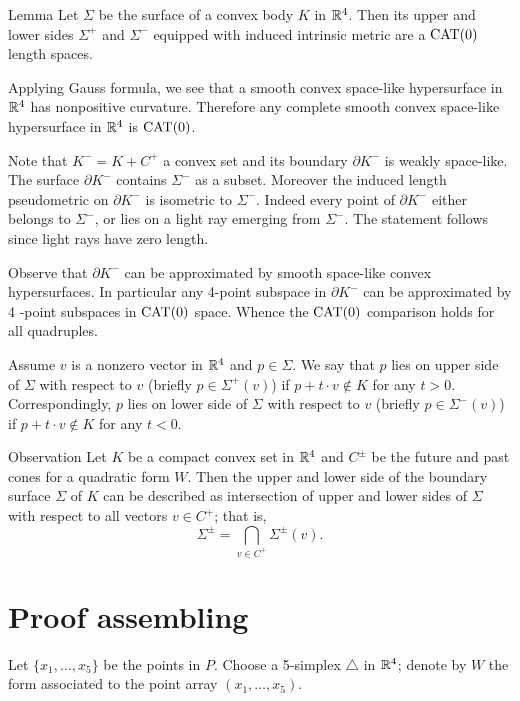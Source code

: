 \documentclass{article}
\begin{document}
\begin{thm}{Lemma}\label{lem:sides}
Let $\Sigma$ be the surface of a convex body $K$ in $\mathbb{R}^4$.
Then its upper and lower sides $\Sigma^+$ and $\Sigma^-$ equipped with induced intrinsic metric are a $\mathrm{CAT}(0)$ length spaces. 
\end{thm}

Applying Gauss formula, we see that a smooth convex space-like hypersurface in $\mathbb{R}^4$ has nonpositive curvature.
Therefore any complete smooth convex space-like hypersurface in $\mathbb{R}^4$ is $\mathrm{CAT}(0)$.

Note that $K^-=K+C^+$ a convex set and its boundary $\partial K^-$ is weakly space-like.
The surface $\partial K^-$ contains $\Sigma^-$ as a subset.
Moreover the induced length pseudometric on $\partial K^-$ is isometric to $\Sigma^-$.
Indeed every point of $\partial K^-$ either belongs to  $\Sigma^-$, or lies on a light ray emerging from $\Sigma^-$.
The statement follows since light rays have zero length.

Observe that $\partial K^-$ can be approximated by smooth space-like convex hypersurfaces.
In particular any 4-point subspace in $\partial K^-$ can be approximated by 4 -point subspaces in $\mathrm{CAT}(0)$ space.
Whence the $\mathrm{CAT}(0)$ comparison holds for all quadruples.
\qeds




Assume $v$ is a nonzero vector in $\mathbb{R}^4$ and $p\in\Sigma$.
We say that $p$ lies on upper side of $\Sigma$ with respect to $v$ (briefly $p\in \Sigma^+(v)$) if $p+t\cdot v\notin K$ for any $t>0$.
Correspondingly, $p$ lies on lower side of $\Sigma$ with respect to $v$ (briefly $p\in \Sigma^-(v)$) if $p+t\cdot v\notin K$ for any $t<0$.

\begin{thm}{Observation}\label{obs:Sigma(v)}
Let $K$ be a compact convex set in $\mathbb{R}^4$ and $C^\pm$ be the future and past cones for a quadratic form $W$.
Then the upper and lower side of the boundary surface $\Sigma$ of $K$ can be described as intersection of upper and lower sides of $\Sigma$ with respect to all vectors $v\in C^+$;
that is,
\[\Sigma^\pm=\bigcap_{v\in C^+}\Sigma^\pm(v).\]
\end{thm}

\section{Proof assembling}

Let $\{x_1,\dots,x_5\}$ be the points in $P$.
Choose a 5-simplex $\triangle$ in $\mathbb{R}^4$; denote by $W$ the form associated to the point array $(x_1,\dots,x_5)$.
\end{document}

